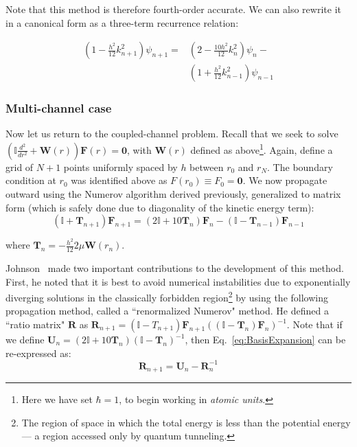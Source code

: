\documentclass[%
 reprint,
 amsmath,amssymb,
 aps,
 nofootinbib
]{revtex4-1}
\begin{document}
\noindent Note that this method is therefore fourth-order accurate. We can also rewrite it in a canonical form as a three-term recurrence relation:

\begin{eqnarray*}
\left( 1 - \frac{h^2}{12} k_{n+1}^2 \right)  \psi_{n+1} =& \left(2-\frac{10 h^2}{12}k_n^2 \right) \psi_n - \\ &\left( 1 + \frac{h^2}{12}k_{n-1}^2 \right) \psi_{n-1}
\end{eqnarray*}

\subsubsection{Multi-channel case}
Now let us return to the coupled-channel problem. Recall that we seek to solve $\left( \mathbb{I} \frac{d^2}{dr^2} + \mathbf{W}(r) \right) \mathbf{F}(r) = \mathbf{0}$, with $\mathbf{W}(r)$ defined as above\footnote{Here we have set $\hbar = 1$, to begin working in \textit{atomic units}.}. Again, define a grid of $N+1$ points uniformly spaced by $h$ between $r_0$ and $r_N$. The boundary condition at $r_0$ was identified above as $F(r_0) \equiv F_0 = \mathbf{0}$. We now propagate outward using the Numerov algorithm derived previously, generalized to matrix form (which is safely done due to diagonality of the kinetic energy term): 
\begin{equation}
\left(\mathbb{I}+\mathbf{T}_{n+1}\right) \mathbf{F}_{n+1} = \left(2\mathbb{I}+10\mathbf{T}_{n} \right)\mathbf{F}_n - \left(\mathbb{I}-\mathbf{T}_{n-1} \right) \mathbf{F}_{n-1}
\label{eq:MatrixNumerov}
\end{equation}

\noindent where $\mathbf{T}_n = -\frac{h^2}{12} 2 \mu \mathbf{W}(r_n)$. 

Johnson~\cite{JohnsonNumerov,Johnson73} made two important contributions to the development of this method. First, he noted that it is best to avoid numerical instabilities due to exponentially diverging solutions in the classically forbidden region\footnote{The region of space in which the total energy is less than the potential energy--- a region accessed only by quantum tunneling.} by using the following propagation method, called a ``renormalized Numerov" method. He defined a ``ratio matrix" $\mathbf{R}$ as $\mathbf{R}_{n+1} = \left( \mathbb{I} - T_{n+1}\right) \mathbf{F}_{n+1} \left((\mathbb{I}-\mathbf{T}_n)\mathbf{F}_n\right)^{-1}$. Note that if we define $\mathbf{U}_n = \left(2\mathbb{I}+10\mathbf{T}_n\right) \left(\mathbb{I}-\mathbf{T}_n\right)^{-1}$, then Eq.~\ref{eq:BasisExpansion} can be re-expressed as:
\begin{equation}
\mathbf{R}_{n+1} = \mathbf{U}_n - \mathbf{R}_n^{-1}
\end{equation}
\end{document}
